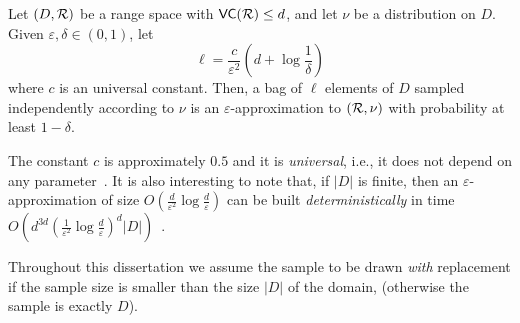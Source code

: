 \begin{theorem}\label{thm:eapprox}
  Let $(D,\mathcal{R})$ be a range space with $\mathsf{VC}(\mathcal{R})\le d$, and let $\nu$ be a
  distribution on $D$. Given $\varepsilon,\delta\in(0,1)$, let
  \begin{equation}\label{eq:vceapprox}
  \ell = \frac{c}{\varepsilon^2}\left(d + \log\frac{1}{\delta}\right)
  \end{equation}
  where $c$ is an universal constant. Then, a bag of $\ell$ elements of $D$
  sampled independently according to $\nu$ is an $\varepsilon$-approximation to
  $(\mathcal{R},\nu)$ with probability at least $1-\delta$.
\end{theorem}
The constant $c$ is approximately $0.5$ and it is
\emph{universal}, i.e., it does not depend on any parameter~\citep{LofflerP09}.  
It is also interesting to note that, if $|D|$ is finite, then an
$\varepsilon$-approximation of size
$O(\frac{d}{\varepsilon^2}\log{\frac{d}{\varepsilon}})$ can be built
\emph{deterministically} in time
$O(d^{3d}(\frac{1}{\varepsilon^2}\log{\frac{d}{\varepsilon}})^d|D|)$~\citep{Chazelle00}.

Throughout this dissertation we assume the sample to be drawn \emph{with}
replacement if the sample size is smaller than the size $|D|$ of the domain,
(otherwise the sample is exactly $D$).  


